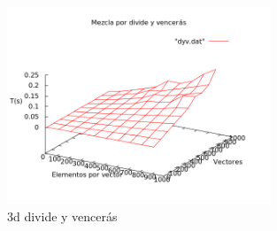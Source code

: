 \begin{frame}
	\begin{block}
	
	\begin{figure}[htb] 
	\centering
	\includegraphics[width=0.7\textwidth]{../Obligatorio/Graficas/3d_dyv.png}
	\caption{3d divide y vencerás} 
	\label{fig:3d_d} 
\end{figure}
	\end{block}
\end{frame}	
